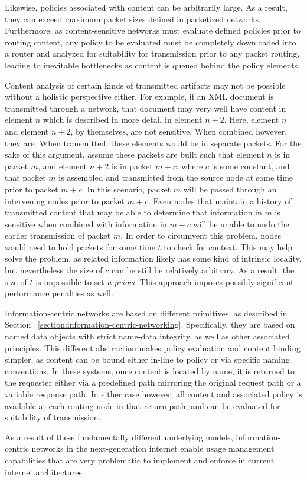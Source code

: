 Likewise, policies associated with content can be arbitrarily large.  As a result, they can exceed maximum packet sizes defined in packetized networks.  Furthermore, as content-sensitive networks must evaluate defined policies prior to routing content, any policy to be evaluated must be completely downloaded into a router and analyzed for suitability for transmission prior to any packet routing, leading to inevitable bottlenecks as content is queued behind the policy elements.

Content analysis of certain kinds of transmitted artifacts may not be possible without a holistic perspective either.  For example, if an XML document is transmitted through a network, that document may very well have content in element $n$ which is described in more detail in element $n+2$.  Here, element $n$ and element $n+2$, by themselves, are not sensitive.  When combined however, they are.  When transmitted, these elements would be in separate packets.  For the sake of this argument, assume these packets are built such that element $n$ is in packet $m$, and element $n+2$ is in packet $m+c$, where $c$ is some constant, and that packet $m$ is assembled and transmitted from the source node at some time prior to packet $m+c$.  In this scenario, packet $m$ will be passed through an intervening nodes prior to packet $m+c$.  Even nodes that maintain a history of transmitted content that may be able to determine that information in $m$ is sensitive when combined with information in $m+c$ will be unable to undo the earlier transmission of packet $m$.  In order to circumvent this problem, nodes would need to hold packets for some time $t$ to check for context.  This may help solve the problem, as related information likely has some kind of intrinsic locality, but nevertheless the size of $c$ can be still be relatively arbitrary.  As a result, the size of $t$ is impossible to set {\it a priori}.  This approach imposes possibly significant performance penalties as well.

Information-centric networks are based on different primitives, as described in Section ~\ref{section:information-centric-networking}.  Specifically, they are based on named data objects with strict name-data integrity, as well as other associated principles.  This different abstraction makes policy evaluation and content binding simpler, as content can be bound either in-line to policy or via specific naming conventions.  In these systems, once content is located by name, it is returned to the requester either via a predefined path mirroring the original request path or a variable response path.  In either case however, all content and associated policy is available at each routing node in that return path, and can be evaluated for suitability of transmission.

As a result of these fundamentally different underlying models, information-centric networks in the next-generation internet enable usage management capabilities that are very problematic to implement and enforce in current internet architectures.
